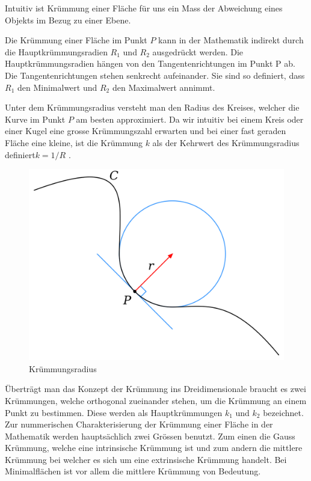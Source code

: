 \begin{refsection}
Intuitiv ist Krümmung einer Fläche für uns ein Mass der Abweichung eines Objekts im Bezug zu einer Ebene. 

Die Krümmung einer Fläche im Punkt $P$ kann in der Mathematik indirekt durch die Hauptkrümmungsradien $R_1$ und $R_2$ ausgedrückt werden. 
Die Hauptkrümmungsradien hängen von den Tangentenrichtungen im Punkt P ab. 
Die Tangentenrichtungen stehen senkrecht aufeinander.
Sie sind so definiert, dass $R_1$ den Minimalwert und $R_2$ den Maximalwert annimmt.

Unter dem Krümmungsradius versteht man den Radius des Kreises, welcher die Kurve im Punkt $P$ am besten approximiert. 
Da wir intuitiv bei einem Kreis oder einer Kugel eine grosse Krümmungszahl erwarten und bei einer fast geraden Fläche eine kleine, ist die Krümmung $k$  als der Kehrwert des Krümmungsradius definiert$k=1/R$ . 

\begin{figure} 
  \centering
  \includegraphics[scale=0.1]{minimal/Kruemmungsradius.png}
  \caption{Krümmungsradius} 
\end{figure}

Überträgt man das Konzept der Krümmung ins Dreidimensionale braucht es zwei Krümmungen, welche orthogonal zueinander stehen, um die Krümmung an einem Punkt zu bestimmen. Diese werden als Hauptkrümmungen $k_1$ und $k_2$ bezeichnet.
Zur nummerischen Charakterisierung der Krümmung einer Fläche in der Mathematik werden hauptsächlich zwei Grössen benutzt.
Zum einen die Gauss Krümmung, welche eine intrinsische Krümmung ist und zum andern die mittlere Krümmung bei welcher es sich um eine extrinsische Krümmung handelt. Bei Minimalflächen ist vor allem die mittlere Krümmung von Bedeutung.



\end{refsection}
